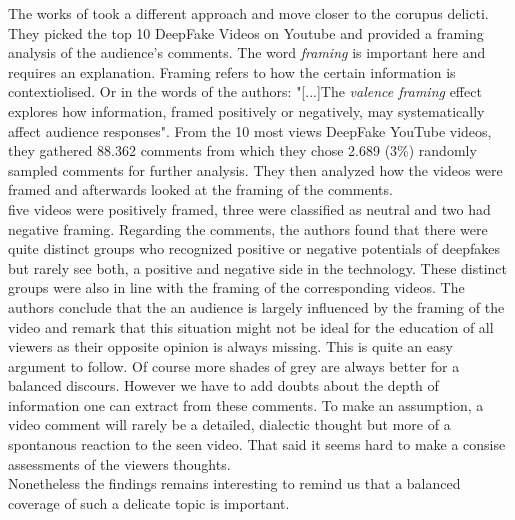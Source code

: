 \documentclass[
  a4paper,  %
  twoside,  %
  bibliography=totoc,
  headsepline,
  cleardoublepage=empty,
  parskip=half,
  draft=false
]{scrbook}
\begin{document}
The works of \citeauthor{leeBelieveNotBelieve2021} took a different approach and move closer to the corupus delicti. They picked the top 10 DeepFake Videos on Youtube and provided a framing analysis of the audience's comments. The word \textit{framing} is important here and requires an explanation. Framing refers to how the certain information is contextiolised. Or in the words of the authors: "[...]The \textit{valence framing} effect explores how information, framed positively or negatively, may systematically affect audience responses". From the 10 most views DeepFake YouTube videos, they gathered 88.362 comments from which they chose 2.689 (3\%) randomly sampled comments for further analysis. They then analyzed how the videos were framed and afterwards looked at the framing of the comments.\\
five videos were positively framed, three were classified as neutral and two had negative framing. Regarding the comments, the authors found that there were quite distinct groups who recognized positive or negative potentials of deepfakes but rarely see both, a positive and negative side in the technology. These distinct groups were also in line with the framing of the corresponding videos. The authors conclude that the an audience is largely influenced by the framing of the video and remark that this situation might not be ideal for the education of all viewers as their opposite opinion is always missing. This is quite an easy argument to follow. Of course more shades of grey are always better for a balanced discours. However we have to add doubts about the depth of information one can extract from these comments. To make an assumption, a video comment will rarely be a detailed, dialectic thought but more of a spontanous reaction to the seen video. That said it seems hard to make a consise assessments of the viewers thoughts. \\
Nonetheless the findings remains interesting to remind us that a balanced coverage of such a delicate topic is important.
\end{document}
